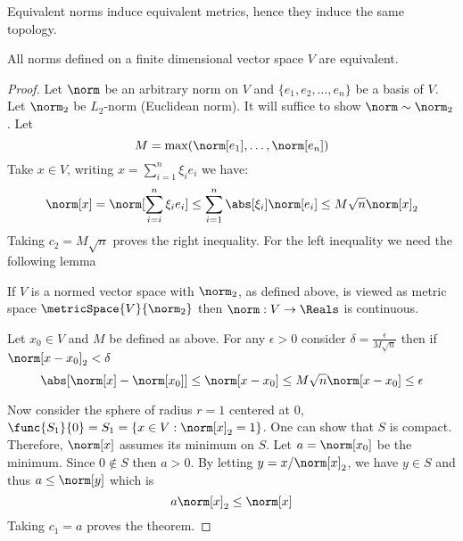 \begin{remark}
    Equivalent norms induce equivalent metrics, hence they induce the same topology.
\end{remark}

\begin{theorem} \label{th:normsEquivalent}
    All norms defined on a finite dimensional vector space \(V\) are equivalent.
\end{theorem}

\begin{proof}
    Let \(\norm\) be an arbitrary norm on \(V\) and \(\{e_1, e_2, \dots , e_n\} \) be a basis of \(V\). Let \(\norm_2\) be \(L_2\)-norm (Euclidean norm). It will suffice to show \(\norm \sim \norm_2\). Let
    \begin{equation*}
        M = \max \! \left( \norm[e_1], \dots , \norm[e_n] \right)
    \end{equation*}
    Take \(x \in V\), writing \(x = \sum_{i = 1}^n {\xi_i e_i}\) we have:
    \begin{equation*}
        \norm[x] = \norm[\sum_{i = i}^n {\xi_i e_i}] \leq \sum_{i = 1}^n \abs[\xi_i] \norm[e_i] \leq M \sqrt{n} \norm[x]_2
    \end{equation*}
    Taking \(c_2 = M \sqrt{n}\) proves the right inequality. For the left inequality we need the following lemma
    \begin{lemma} \label{lm:ContinuityOfNorm}
        If \(V\) is a normed vector space with \(\norm_2\), as defined above, is viewed as metric space \(\metricSpace{V}{\norm_2}\) then \(\norm : V \to \Reals\) is continuous.
    \end{lemma}

    \begin{prooflemma}
        Let \(x_0 \in V\) and \(M\) be defined as above. For any \(\epsilon > 0\) consider \(\delta = \frac{\epsilon}{M \sqrt{n}}\) then if \(\norm[x - x_0]_2 < \delta\)
        \begin{equation*}
            \abs[{\norm[x] - \norm[x_0]}] \leq \norm[x - x_0] \leq M \sqrt{n} \norm[x - x_0] \leq \epsilon
        \end{equation*}
    \end{prooflemma}

    Now consider the sphere of radius \(r = 1\) centered at \(0\), \(\func{S_1}{0} = S_1 = \{x \in V : \norm[x]_2 = 1\}\). One can show that \(S\) is compact. Therefore, \(\norm[x]\) assumes its minimum on \(S\). Let \( a = \norm[x_0]\) be the minimum. Since \(0 \notin S\) then \(a > 0\). By letting \(y = x / \norm[x]_2 \), we have \(y \in S\) and thus \(a \leq \norm[y]\) which is
    \begin{equation*}
        a \norm[x]_2 \leq \norm[x]
    \end{equation*}
    Taking \(c_1 = a\) proves the theorem.
\end{proof}

